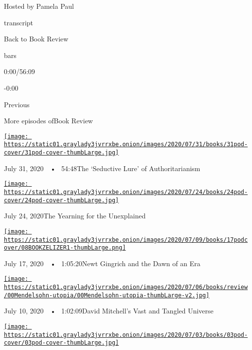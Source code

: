 Hosted by Pamela Paul

transcript

Back to Book Review

bars

0:00/56:09

-0:00

Previous

More episodes ofBook Review

\href{https://www.nytimes3xbfgragh.onion/2020/07/31/books/review/podcast-twilight-democracy-anne-applebaum-eat-buddha-barbara-demick.html?action=click\&module=audio-series-bar\&region=header\&pgtype=Article}{\texttt{[image: https://static01.graylady3jvrrxbe.onion/images/2020/07/31/books/31pod-cover/31pod-cover-thumbLarge.jpg]}}

July 31, 2020~~•~ 54:48The `Seductive Lure' of Authoritarianism

\href{https://www.nytimes3xbfgragh.onion/2020/07/24/books/review/podcast-colin-dickey-unexplained-miles-harvey-king-of-confidence.html?action=click\&module=audio-series-bar\&region=header\&pgtype=Article}{\texttt{[image: https://static01.graylady3jvrrxbe.onion/images/2020/07/24/books/24pod-cover/24pod-cover-thumbLarge.jpg]}}

July 24, 2020The Yearning for the Unexplained

\href{https://www.nytimes3xbfgragh.onion/2020/07/17/books/review/podcast-julian-zelizer-burning-down-house-newt-gingrich-notes-silencing-lacy-crawford.html?action=click\&module=audio-series-bar\&region=header\&pgtype=Article}{\texttt{[image: https://static01.graylady3jvrrxbe.onion/images/2020/07/09/books/17podcover/08BOOKZELIZER1-thumbLarge.png]}}

July 17, 2020~~•~ 1:05:20Newt Gingrich and the Dawn of an Era

\href{https://www.nytimes3xbfgragh.onion/2020/07/10/books/review/david-mitchell-utopia-avenue-daniel-mendelsohn-biggest-bluff-poker-maria-konnikova.html?action=click\&module=audio-series-bar\&region=header\&pgtype=Article}{\texttt{[image: https://static01.graylady3jvrrxbe.onion/images/2020/07/06/books/review/00Mendelsohn-utopia/00Mendelsohn-utopia-thumbLarge-v2.jpg]}}

July 10, 2020~~•~ 1:02:09David Mitchell's Vast and Tangled Universe

\href{https://www.nytimes3xbfgragh.onion/2020/07/03/books/review/podcast-jules-feiffer-smart-george-steve-inskeep-imperfect-union.html?action=click\&module=audio-series-bar\&region=header\&pgtype=Article}{\texttt{[image: https://static01.graylady3jvrrxbe.onion/images/2020/07/03/books/03pod-cover/03pod-cover-thumbLarge.jpg]}}

